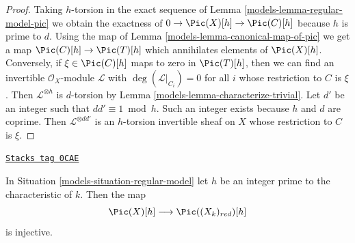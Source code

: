 \begin{proof}

Taking $h$-torsion in the exact sequence of
Lemma \ref{models-lemma-regular-model-pic}
we obtain the exactness of
$0 \to \Pic(X)[h] \to \Pic(C)[h]$
because $h$ is prime to $d$.
Using the map of Lemma \ref{models-lemma-canonical-map-of-pic}
we get a map $\Pic(C)[h] \to \Pic(T)[h]$
which annihilates elements of $\Pic(X)[h]$.
Conversely, if $\xi \in \Pic(C)[h]$
maps to zero in $\Pic(T)[h]$, then we can find
an invertible $\mathcal{O}_X$-module $\mathcal{L}$
with $\deg(\mathcal{L}|_{C_i}) = 0$ for all $i$
whose restriction to $C$ is $\xi$.
Then $\mathcal{L}^{\otimes h}$ is $d$-torsion by
Lemma \ref{models-lemma-characterize-trivial}.
Let $d'$ be an integer such that $dd' \equiv 1 \bmod h$.
Such an integer exists because $h$ and $d$ are coprime.
Then $\mathcal{L}^{\otimes dd'}$ is an $h$-torsion
invertible sheaf on $X$ whose restriction to $C$ is $\xi$.
\end{proof}

\begin{lemma}
\label{models-lemma-torsion-embeds}
\href{https://stacks.math.columbia.edu/tag/0CAE}{\texttt{Stacks tag 0CAE}}

In Situation \ref{models-situation-regular-model} let $h$ be an integer
prime to the characteristic of $k$. Then the map
$$
\Pic(X)[h] \longrightarrow \Pic((X_k)_{red})[h]
$$
is injective.
\end{lemma}

